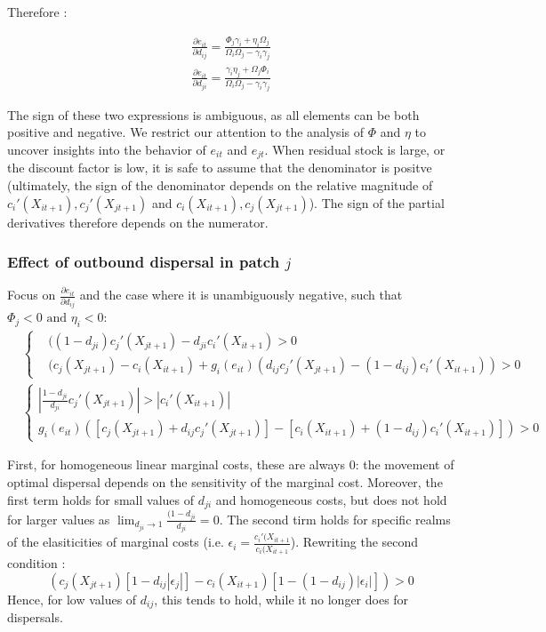 Therefore : 

\begin{align}
\frac{\partial e_{it}}{\partial d_{ij}} = \frac{\Phi_j \gamma_i + \eta_i \Omega_j}{\Omega_i \Omega_j - \gamma_i\gamma_j} \\
\frac{\partial e_{it}}{\partial d_{ji}} = \frac{\gamma_i \eta_j + \Omega_j \Phi_i}{\Omega_i \Omega_j - \gamma_i \gamma_j}
\end{align}

The sign of these two expressions is ambiguous, as all elements can be both positive and negative. We restrict our attention to the analysis of $\Phi$ and $\eta$ to uncover insights into the behavior of $e_{it}$ and $e_{jt}$. When residual stock is large, or the discount factor is low, it is safe to assume that the denominator is positve (ultimately, the sign of the denominator depends on the relative magnitude of $c_i'(X_{it+1}), c_j'(X_{jt+1})$ and $c_i(X_{it+1}), c_j(X_{jt+1})$). The sign of the partial derivatives therefore depends on the numerator.\\

\subsubsection{Effect of outbound dispersal in patch $j$}

Focus on $\frac{\partial e_{it}}{\partial d_{ij}}$ and the case where it is unambiguously negative, such that $\Phi_j<0 \text{ and } \eta_i<0$:
\begin{align*}
&
\begin{cases}
&((1-d_{ji})c_j'(X_{jt+1}) -d_{ji}c_i'(X_{it+1})>0\\
& (c_j(X_{jt+1}) - c_i(X_{it+1}) + g_i(e_{it}) (d_{ij}c_j'(X_{jt+1}) - (1-d_{ij})c_i'(X_{it+1}))>0
\end{cases}
\\
&
\begin{cases}
\left|\frac{1 - d_{ji}}{d_{ji}}c_j'(X_{jt+1})\right| > \left|c_i'(X_{it+1})\right| \\
g_i(e_{it}) \left( [ c_j(X_{jt+1}) + d_{ij}c_j'(X_{jt+1}) ] - \left[ c_i(X_{it+1}) + (1 - d_{ij})c_i'(X_{it+1}) \right] \right) > 0
\end{cases}
\end{align*}

First, for homogeneous linear marginal costs, these are always 0: the movement of optimal dispersal depends on the sensitivity of the marginal cost. Moreover, the first term holds for small values of $d_{ji}$ and homogeneous costs, but does not hold for larger values as $\lim_{d_{ji} \to 1} \frac{(1-d_{ji}}{d_{ji}}=0$. The second tirm holds for specific realms of the elasiticities of marginal costs (i.e. $\epsilon_i = \frac{c_i'(X_{it+1}}{c_i(X_{it+1}}$). Rewriting the second condition :
\begin{equation}
\left(  c_j(X_{jt+1})[1-d_{ij}|\epsilon_j|] - c_i(X_{it+1})[1-(1-d_{ij})|\epsilon_i|]\right)>0
\end{equation}
Hence, for low values of $d_{ij}$, this tends to hold, while it no longer does for dispersals. 

